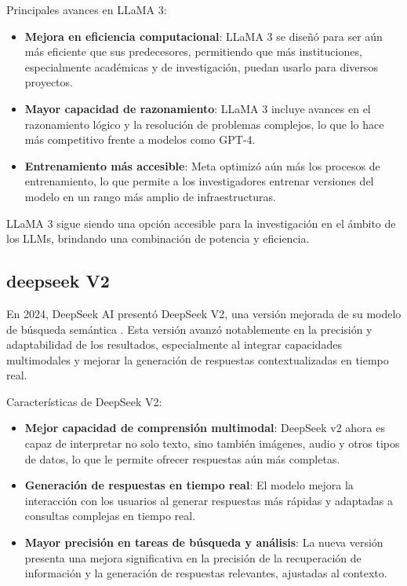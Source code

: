 Principales avances en LLaMA 3:
\begin{itemize}
    \item \textbf{Mejora en eficiencia computacional}: LLaMA 3 se diseñó para ser aún más eficiente que sus predecesores, permitiendo que más instituciones, especialmente académicas y de investigación, puedan usarlo para diversos proyectos.
    \item \textbf{Mayor capacidad de razonamiento}: LLaMA 3 incluye avances en el razonamiento lógico y la resolución de problemas complejos, lo que lo hace más competitivo frente a modelos como GPT-4.
    \item \textbf{Entrenamiento más accesible}: Meta optimizó aún más los procesos de entrenamiento, lo que permite a los investigadores entrenar versiones del modelo en un rango más amplio de infraestructuras.
\end{itemize}

LLaMA 3 sigue siendo una opción accesible para la investigación en el ámbito de los LLMs, brindando una combinación de potencia y eficiencia.


\subsection{deepseek V2}

En 2024, DeepSeek AI presentó DeepSeek V2, una versión mejorada de su modelo de búsqueda semántica \cite{deepseekai2024deepseekv2strongeconomicalefficient}. 
Esta versión avanzó notablemente en la precisión y adaptabilidad de los resultados, especialmente al integrar capacidades multimodales y mejorar la generación de respuestas contextualizadas en tiempo real.

Características de DeepSeek V2:
\begin{itemize}
    \item \textbf{Mejor capacidad de comprensión multimodal}: DeepSeek v2 ahora es capaz de interpretar no solo texto, sino también imágenes, audio y otros tipos de datos, lo que le permite ofrecer respuestas aún más completas.
    \item \textbf{Generación de respuestas en tiempo real}: El modelo mejora la interacción con los usuarios al generar respuestas más rápidas y adaptadas a consultas complejas en tiempo real.
    \item \textbf{Mayor precisión en tareas de búsqueda y análisis}: La nueva versión presenta una mejora significativa en la precisión de la recuperación de información y la generación de respuestas relevantes, ajustadas al contexto.
\end{itemize}

